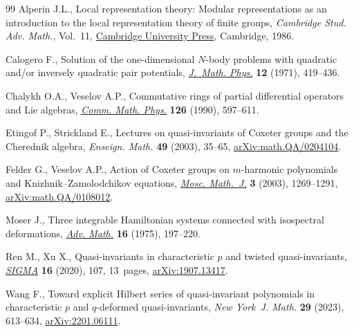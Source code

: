 \documentclass[11pt]{article}
\numberwithin{equation}{section}
\theoremstyle{definition}
\numberwithin{equation}{section}
\begin{document}
\endgroup
\begin{thebibliography}{99}
Alperin J.L., Local representation theory: {M}odular representations as an
 introduction to the local representation theory of finite groups,
 \textit{Cambridge Stud. Adv. Math.}, Vol.~11,
 \href{https://doi.org/10.1017/CBO9780511623592}{Cambridge University Press},
 Cambridge, 1986.

Calogero F., Solution of the one-dimensional {$N$}-body problems with quadratic
 and/or inversely quadratic pair potentials,
 \href{https://doi.org/10.1063/1.1665604}{\textit{J.~Math. Phys.}} \textbf{12}
 (1971), 419--436.

Chalykh O.A., Veselov A.P., Commutative rings of partial differential operators
 and {L}ie algebras, \href{https://doi.org/10.1007/BF02125702}{\textit{Comm.
 Math. Phys.}} \textbf{126} (1990), 597--611.

Etingof P., Strickland E., Lectures on quasi-invariants of {C}oxeter groups and
 the {C}herednik algebra, \textit{Enseign. Math.} \textbf{49} (2003), 35--65,
 \href{http://arxiv.org/abs/math.QA/0204104}{arXiv:math.QA/0204104}.

Felder G., Veselov A.P., Action of {C}oxeter groups on {$m$}-harmonic
 polynomials and {K}nizhnik--{Z}amolodchikov equations,
 \href{https://doi.org/10.17323/1609-4514-2003-3-4-1269-1291}{\textit{Mosc.
 Math.~J.}} \textbf{3} (2003), 1269--1291,
 \href{http://arxiv.org/abs/math.QA/0108012}{arXiv:math.QA/0108012}.

Moser J., Three integrable {H}amiltonian systems connected with isospectral
 deformations,
 \href{https://doi.org/10.1016/0001-8708(75)90151-6}{\textit{Adv. Math.}}
 \textbf{16} (1975), 197--220.

Ren M., Xu X., Quasi-invariants in characteristic {$p$} and twisted
 quasi-invariants,
 \href{https://doi.org/10.3842/SIGMA.2020.107}{\textit{SIGMA}} \textbf{16}
 (2020), 107, 13~pages,
 \href{http://arxiv.org/abs/1907.13417}{arXiv:1907.13417}.

Wang F., Toward explicit {H}ilbert series of quasi-invariant polynomials in
 characteristic {$p$} and {$q$}-deformed quasi-invariants, \textit{New York~J.
 Math.} \textbf{29} (2023), 613--634,
 \href{http://arxiv.org/abs/2201.06111}{arXiv:2201.06111}.

\end{thebibliography}
\end{document}
